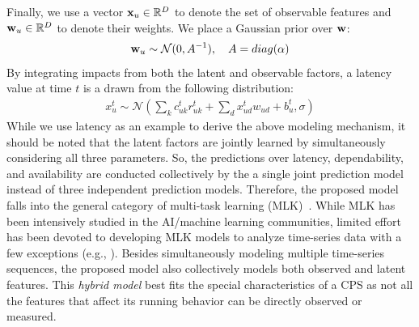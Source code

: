 \documentclass[12pt]{article}
\begin{document}
Finally, we use a vector ${\bf x}_u \in \mathbb{R}^D$ to denote the set of observable features and ${\bf w}_u \in \mathbb{R}^D$ to denote their weights. We place a Gaussian prior over ${\bf w}$: 
 \begin{align}
 {\bf w}_u \sim \mathcal{N} (0,A^{-1}), \quad A=diag(\alpha)
 \end{align}
By integrating impacts from both the latent and observable factors, a latency value at time $t$ is a drawn from the following distribution: 
 \begin{align}
 x^t_u \sim \mathcal{N}(\sum_k c^t_{uk} r_{uk}^t+\sum_d x_{ud}^tw_{ud}+b_u^t,\sigma)
 \end{align}
While we use latency as an example to derive the above modeling mechanism, it should be noted that the latent factors are jointly learned by simultaneously considering all three parameters. So, the predictions over latency, dependability, and availability are conducted collectively by the a single joint prediction model instead of three independent prediction models. Therefore, the proposed model falls into the general category of multi-task learning (MLK)~\cite{zhang2017survey}. While MLK has been intensively studied in the AI/machine learning communities, limited effort has been devoted to developing MLK models to analyze time-series data with a few exceptions (e.g., \cite{wang2012high}). Besides simultaneously modeling multiple time-series sequences, the proposed model also collectively models both observed and latent features. This {\em hybrid model} best fits the special characteristics of a CPS as not all the features that affect its running behavior can be directly observed or measured. 











\end{document}
